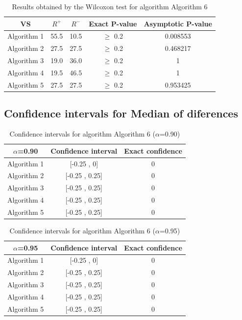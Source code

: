 \documentclass[a4paper,10pt]{article}
\begin{document}
\begin{table}[!htp]
\centering\small
\begin{tabular}{
|c|c|c|c|c|}
\hline
 VS & $R^{+}$ & $R^{-}$ & Exact P-value & Asymptotic P-value \\ \hline 
Algorithm 1 & 55.5 & 10.5 & $\geq$ 0.2 & 0.008553\\ \hline 
Algorithm 2 & 27.5 & 27.5 & $\geq$ 0.2 & 0.468217\\ \hline 
Algorithm 3 & 19.0 & 36.0 & $\geq$ 0.2 & 1\\ \hline 
Algorithm 4 & 19.5 & 46.5 & $\geq$ 0.2 & 1\\ \hline 
Algorithm 5 & 27.5 & 27.5 & $\geq$ 0.2 & 0.953425\\ \hline 

\end{tabular}
\caption{Results obtained by the Wilcoxon test for algorithm Algorithm 6}
\end{table}

\subsection{Confidence intervals for Median of diferences}

\begin{table}[!htp]
\centering\small
\begin{tabular}{
|c|c|c|}
\hline
 $\alpha$=0.90 & Confidence interval & Exact confidence \\ \hline 
Algorithm 1 & [-0.25 , 0] & 0\\ \hline 
Algorithm 2 & [-0.25 , 0.25] & 0\\ \hline 
Algorithm 3 & [-0.25 , 0.25] & 0\\ \hline 
Algorithm 4 & [-0.25 , 0.25] & 0\\ \hline 
Algorithm 5 & [-0.25 , 0.25] & 0\\ \hline 

\end{tabular}
\caption{Confidence intervals for algorithm Algorithm 6 ($\alpha$=0.90)}
\end{table}
\begin{table}[!htp]
\centering\small
\begin{tabular}{
|c|c|c|}
\hline
 $\alpha$=0.95 & Confidence interval & Exact confidence \\ \hline 
Algorithm 1 & [-0.25 , 0] & 0\\ \hline 
Algorithm 2 & [-0.25 , 0.25] & 0\\ \hline 
Algorithm 3 & [-0.25 , 0.25] & 0\\ \hline 
Algorithm 4 & [-0.25 , 0.25] & 0\\ \hline 
Algorithm 5 & [-0.25 , 0.25] & 0\\ \hline 

\end{tabular}
\caption{Confidence intervals for algorithm Algorithm 6 ($\alpha$=0.95)}
\end{table}

 \clearpage 
\end{document}
